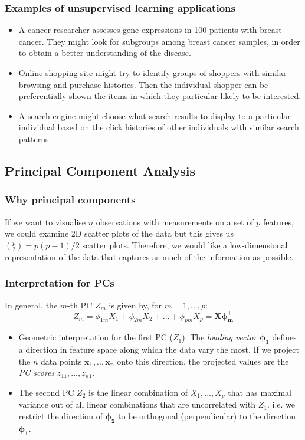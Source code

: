 \documentclass[11pt]{article}
\begin{document}
\subsubsection*{Examples of unsupervised learning applications}
\begin{itemize}
    \item A cancer researcher assesses gene expressions in 100 patients with breast cancer. They might look for subgroups among breast cancer samples, in order to obtain a better understanding of the disease.
    \item Online shopping site might try to identify groups of shoppers with similar browsing and purchase histories. Then the individual shopper can be preferentially shown the items in which they particular likely to be interested.
    \item A search engine might choose what search results to display to a particular individual based on the click histories of other individuals with similar search patterns.
\end{itemize}

\subsection{Principal Component Analysis}
\subsubsection*{Why principal components}
\noindent If we want to visualise $n$ observations with measurements on a set of $p$ features, we could examine 2D scatter plots of the data but this gives us $\binom{p}{2}=p(p-1)/2$ scatter plots. Therefore, we would like a low-dimensional representation of the data that captures as much of the information as possible.

\subsubsection{Interpretation for PCs}
\noindent In general, the $m$-th PC $Z_m$ is given by, for $m=1,...,p$:
$$Z_m = \phi_{1m}X_1 + \phi_{2m}X_2 + ... + \phi_{pm}X_p = \boldsymbol{X \phi_m^\top}$$
\begin{itemize}
    \item Geometric interpretation for the first PC ($Z_1$). The \textit{loading vector} $\boldsymbol{\phi_1}$ defines a direction in feature space along which the data vary the most. If we project the $n$ data points $\boldsymbol{x_1},..,\boldsymbol{x_n}$ onto this direction, the projected values are the \textit{PC scores} $z_{11},...,z_{n1}$.
    \item The second PC $Z_2$ is the linear combination of $X_1,...,X_p$ that has maximal variance out of all linear combinations that are uncorrelated with $Z_1$. i.e. we restrict the direction of $\boldsymbol{\phi_{2}}$ to be orthogonal (perpendicular) to the direction $\boldsymbol{\phi_1}$.
\end{itemize}
\end{document}
